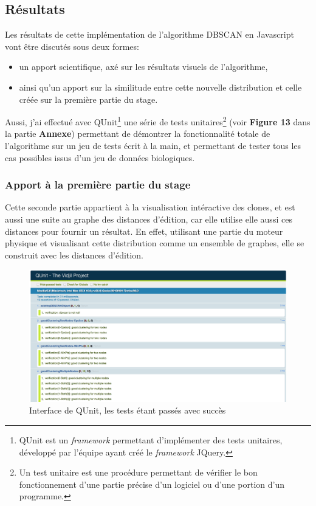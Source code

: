 \documentclass[pdftex,12pt,a4paper]{report}
\begin{document}
\begin{spacing}{1.2}
\section{Résultats}

Les résultats de cette implémentation de l'algorithme DBSCAN en Javascript vont être discutés sous deux formes:
	\begin{itemize}
	\item{un apport scientifique, axé sur les résultats visuels de l'algorithme,}
	\item{ainsi qu'un apport sur la similitude entre cette nouvelle distribution et celle créée sur la première partie du stage.}
	\end{itemize}
Aussi, j'ai effectué avec QUnit\footnote{QUnit est un \textit{framework} permettant d'implémenter des tests unitaires, développé par l'équipe ayant créé le \textit{framework} JQuery.} une série de tests unitaires\footnote{Un test unitaire est une procédure permettant de vérifier le bon fonctionnement d'une partie précise d'un logiciel ou d'une portion d'un programme.} (voir \textbf{Figure 13} dans la partie \textbf{Annexe}) permettant de démontrer la fonctionnalité totale de l'algorithme sur un jeu de tests écrit à la main, et permettant de tester tous les cas possibles issus d'un jeu de données biologiques.

\subsubsection{Apport à la première partie du stage}

Cette seconde partie appartient à la visualisation intéractive des clones, et est aussi une suite au graphe des distances d'édition, car elle utilise elle aussi ces distances pour fournir un résultat.
\newline
En effet, utilisant une partie du moteur physique et visualisant cette distribution comme un ensemble de graphes, elle se construit avec les distances d'édition.

\begin{figure}[H]
\begin{center}
	\includegraphics[scale=0.35]{img/QUnit.jpg}
\end{center}
\caption{Interface de QUnit, les tests étant passés avec succès}
\end{figure}


\end{spacing}
\end{document}
